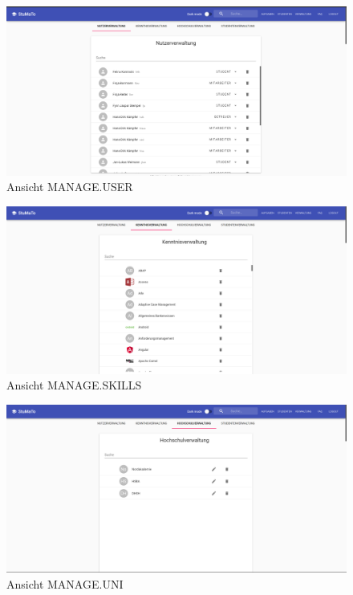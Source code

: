 \documentclass[
  12pt,
  ngerman,
  a4paper,
]{article}
\begin{document}
\begin{figure}
\centering
\includegraphics{./tex2pdf.-c803d322dfea80aa/a755eb96a92ad6d15e845ce1cce757327b2d571b.png}
\caption{Ansicht MANAGE.USER}
\end{figure}

\begin{figure}
\centering
\includegraphics{./tex2pdf.-c803d322dfea80aa/ce3458428610c575dda494aa3efaffc445fa738a.png}
\caption{Ansicht MANAGE.SKILLS}
\end{figure}

\begin{figure}
\centering
\includegraphics{./tex2pdf.-c803d322dfea80aa/84843a33decc9c7d289ff6cdcdf6eee152dcc7c0.png}
\caption{Ansicht MANAGE.UNI}
\end{figure}
\end{document}
